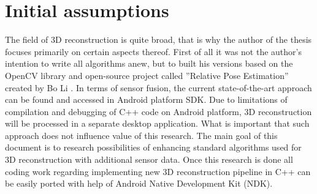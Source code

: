 \section{Initial assumptions}
The field of 3D reconstruction is quite broad, that is why the author of the thesis focuses primarily on certain aspects thereof. First of all it was not the author's intention to write all algorithms anew, but to built his versions based on the OpenCV library and open-source project called ''Relative Pose Estimation'' created by Bo Li \cite{website:relativePoseLibrary}. In terms of sensor fusion, the current state-of-the-art approach can be found and accessed in Android platform SDK. Due to limitations of compilation and debugging of C++ code on Android platform, 3D reconstruction will be processed in a separate desktop application. What is important that such approach does not influence value of this research. The main goal of this document is to research possibilities of enhancing standard algorithms used for 3D reconstruction with additional sensor data. Once this research is done all coding work regarding implementing new 3D reconstruction pipeline in C++ can be easily ported with help of Android Native Development Kit (NDK).  


